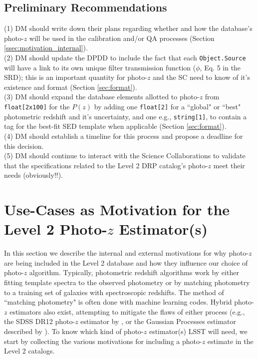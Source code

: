 \documentclass[DM,lsstdraft,toc]{lsstdoc}
\begin{document}
\subsection{Preliminary Recommendations}\label{ssec:intro_pr}

\noindent (1) DM should write down their plans regarding whether and how the database's photo-$z$ will be used in the calibration and/or QA processes (Section \ref{ssec:motivation_internal}). \\
(2) DM should update the DPDD to include the fact that each {\tt Object.Source} will have a link to its own unique filter transmission function ($\phi$, Eq. 5 in the SRD); this is an important quantity for photo-$z$ and the SC need to know of it's existence and format (Section \ref{sec:format}). \\
(3) DM should expand the database elements allotted to photo-$z$ from {\tt float[2x100]} for the $P(z)$ by adding one {\tt float[2]} for a ``global" or ``best" photometric redshift and it's uncertainty, and one e.g., {\tt string[1]}, to contain a tag for the best-fit SED template when applicable (Section \ref{sec:format}). \\
(4) DM should establish a timeline for this process and propose a deadline for this decision. \\
(5) DM should continue to interact with the Science Collaborations to validate that the specifications related to the Level 2 DRP catalog's photo-$z$ meet their needs (obviously!!).


\section{Use-Cases as Motivation for the Level 2 Photo-$z$ Estimator(s)}\label{sec:motivation}

In this section we describe the internal and external motivations for why photo-$z$ are being included in the Level 2 database and how they influence our choice of photo-$z$ algorithm. Typically, photometric redshift algorithms work by either fitting template spectra to the observed photometry or by matching photometry to a training set of galaxies with spectroscopic redshifts. The method of ``matching photometry" is often done with machine learning codes. Hybrid photo-$z$ estimators also exist, attempting to mitigate the flaws of either process (e.g., the SDSS DR12 photo-$z$ estimator by \citealt{2016MNRAS.460.1371B}, or the Gaussian Processes estimator described by \citealt{2016arXiv161200847L}). To know which kind of photo-$z$ estimator(s) LSST will need, we start by collecting the various motivations for including a photo-$z$ estimate in the Level 2 catalogs.
\end{document}
